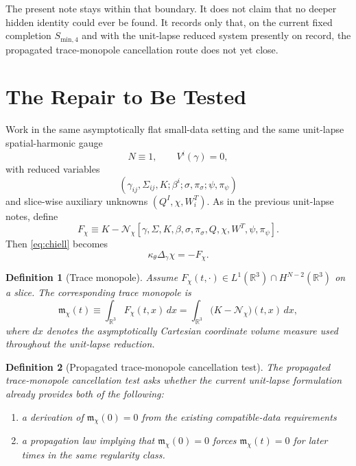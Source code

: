 \documentclass[11pt]{article}
\newtheorem{definition}{Definition}
\begin{document}
The present note stays within that boundary. It does not claim that no deeper hidden identity could ever be found. It records only that, on the current fixed completion \(S_{\mathrm{min},4}\) and with the unit-lapse reduced system presently on record, the propagated trace-monopole cancellation route does not yet close.

\section{The Repair to Be Tested}

Work in the same asymptotically flat small-data setting and the same unit-lapse spatial-harmonic gauge
\begin{equation}
N\equiv 1,
\qquad
V^i(\gamma)=0,
\label{eq:gauge}
\end{equation}
with reduced variables
\begin{equation}
(\gamma_{ij},\Sigma_{ij},K;\beta^i;\sigma,\pi_\sigma;\psi,\pi_\psi)
\label{eq:unknowns}
\end{equation}
and slice-wise auxiliary unknowns \((Q^I,\chi,W_i^T)\). As in the previous unit-lapse notes, define
\begin{equation}
F_\chi
\equiv
K-\mathcal N_\chi[\gamma,\Sigma,K,\beta,\sigma,\pi_\sigma,Q,\chi,W^T,\psi,\pi_\psi].
\label{eq:Fchi}
\end{equation}
Then \eqref{eq:chiell} becomes
\begin{equation}
\kappa_\theta\Delta_\gamma\chi = -F_\chi.
\label{eq:chieq}
\end{equation}

\begin{definition}[Trace monopole]
Assume \(F_\chi(t,\cdot)\in L^1(\mathbb R^3)\cap H^{N-2}(\mathbb R^3)\) on a slice. The corresponding \emph{trace monopole} is
\begin{equation}
\mathfrak m_\chi(t)
\equiv
\int_{\mathbb R^3}F_\chi(t,x)\,dx
=
\int_{\mathbb R^3}\bigl(K-\mathcal N_\chi\bigr)(t,x)\,dx,
\label{eq:mchi}
\end{equation}
where \(dx\) denotes the asymptotically Cartesian coordinate volume measure used throughout the unit-lapse reduction.
\end{definition}

\begin{definition}[Propagated trace-monopole cancellation test]
The \emph{propagated trace-monopole cancellation test} asks whether the current unit-lapse formulation already provides both of the following:
\begin{enumerate}
    \item a derivation of \(\mathfrak m_\chi(0)=0\) from the existing compatible-data requirements
    \item a propagation law implying that \(\mathfrak m_\chi(0)=0\) forces \(\mathfrak m_\chi(t)=0\) for later times in the same regularity class.
\end{enumerate}
\end{definition}
\end{document}
